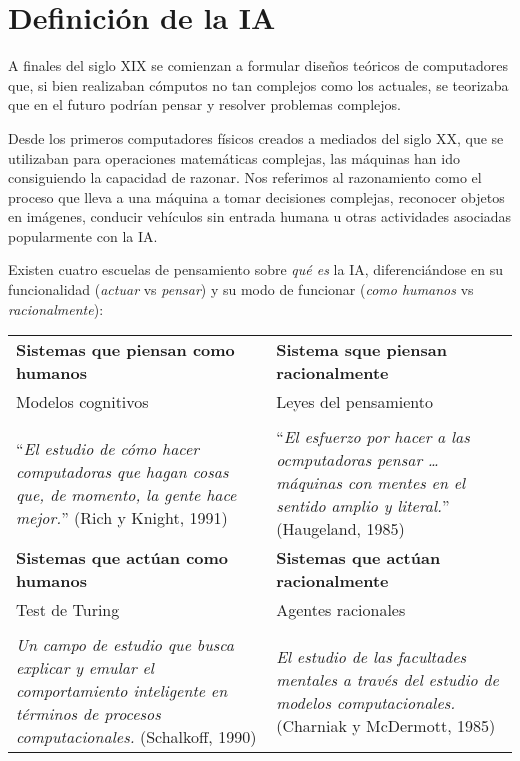 \section{Definición de la IA}

A finales del siglo XIX se comienzan a formular diseños teóricos de computadores que, si bien realizaban cómputos no tan complejos como los actuales, se teorizaba que en el futuro podrían pensar y resolver problemas complejos.

Desde los primeros computadores físicos creados a mediados del siglo XX, que se utilizaban para operaciones matemáticas complejas, las máquinas han ido consiguiendo la capacidad de razonar.
Nos referimos al razonamiento como el proceso que lleva a una máquina a tomar decisiones complejas, reconocer objetos en imágenes, conducir vehículos sin entrada humana u otras actividades asociadas popularmente con la IA\@.

Existen cuatro escuelas de pensamiento sobre \textit{qué es} la IA, diferenciándose en su funcionalidad (\textit{actuar} vs \textit{pensar}) y su modo de funcionar (\textit{como humanos} vs \textit{racionalmente}):

\begin{center}
\begin{tabular}{C{6.5cm} | C{6.5cm}}
\textbf{Sistemas que piensan como humanos} & \textbf{Sistema sque piensan racionalmente} \\
Modelos cognitivos                         & Leyes del pensamiento                       \\
                                           &                                             \\
``\textit{El estudio de cómo hacer computadoras que hagan cosas que, de momento, la gente hace mejor.}'' (Rich y Knight, 1991) &
``\textit{El esfuerzo por hacer a las ocmputadoras pensar \ldots máquinas con mentes en el sentido amplio y literal.}'' (Haugeland, 1985) \\
\hline
\textbf{Sistemas que actúan como humanos} & \textbf{Sistemas que actúan racionalmente} \\
Test de Turing                            & Agentes racionales                         \\
                                          &                                            \\
\textit{Un campo de estudio que busca explicar y emular el comportamiento inteligente en términos de procesos computacionales.} (Schalkoff, 1990) &
\textit{El estudio de las facultades mentales a través del estudio de modelos computacionales.} (Charniak y McDermott, 1985) \\
\end{tabular}
\end{center}

